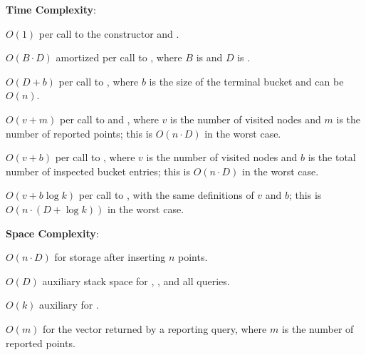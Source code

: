 \textbf{Time Complexity}:
\begin{compactitem}
  \item $O(1)$ per call to the constructor and .
  \item $O(B \cdot D)$ amortized per call to , where $B$ is  and $D$ is .
  \item $O(D + b)$ per call to , where $b$ is the size of the terminal bucket and can be $O(n)$.
  \item $O(v + m)$ per call to  and , where $v$ is the number of visited nodes and $m$ is the number of reported points; this is $O(n \cdot D)$ in the worst case.
  \item $O(v + b)$ per call to , where $v$ is the number of visited nodes and $b$ is the total number of inspected bucket entries; this is $O(n \cdot D)$ in the worst case.
  \item $O(v + b \log k)$ per call to , with the same definitions of $v$ and $b$; this is $O(n \cdot (D + \log k))$ in the worst case.
\end{compactitem}

\textbf{Space Complexity}:
\begin{compactitem}
  \item $O(n \cdot D)$ for storage after inserting $n$ points.
  \item $O(D)$ auxiliary stack space for , , and all queries.
  \item $O(k)$ auxiliary for .
  \item $O(m)$ for the vector returned by a reporting query, where $m$ is the number of reported points.
\end{compactitem}

